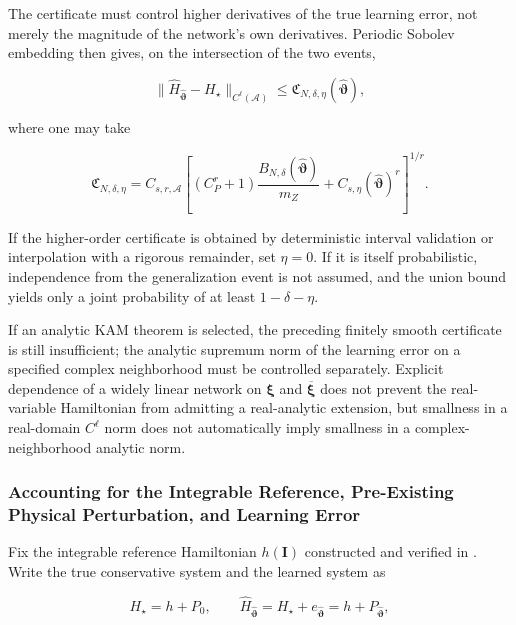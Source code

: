 The certificate must control higher derivatives of the true learning error, not merely the magnitude of the network's own derivatives. Periodic Sobolev embedding then gives, on the intersection of the two events,

\begin{equation}
\label{eq:chnn-4-53}
\left. \parallel{\widehat{H}}_{\widehat{\bm{\vartheta}}} - H_{\star} \right.\parallel_{C^{\ell}\left( \mathcal{A} \right)} \leq \mathfrak{C}_{N,\delta,\eta}\left( \widehat{\bm{\vartheta}} \right),
\end{equation}

where one may take

\begin{equation}
\label{eq:chnn-4-54}
\mathfrak{C}_{N,\delta,\eta} = C_{s,r,\mathcal{A}}\left\lbrack \left( C_{P}^{r} + 1 \right)\frac{B_{N,\delta}\left( \widehat{\bm{\vartheta}} \right)}{m_{Z}} + C_{s,\eta}\left( \widehat{\bm{\vartheta}} \right)^{r} \right\rbrack^{1/r}.
\end{equation}

If the higher-order certificate is obtained by deterministic interval validation or interpolation with a rigorous remainder, set \(\eta=0\). If it is itself probabilistic, independence from the generalization event is not assumed, and the union bound yields only a joint probability of at least \(1-\delta-\eta\).

If an analytic KAM theorem is selected, the preceding finitely smooth certificate is still insufficient; the analytic supremum norm of the learning error on a specified complex neighborhood must be controlled separately. Explicit dependence of a widely linear network on \(\bm{\xi}\) and \(\overline{\bm{\xi}}\) does not prevent the real-variable Hamiltonian from admitting a real-analytic extension, but smallness in a real-domain \(C^{\ell}\) norm does not automatically imply smallness in a complex-neighborhood analytic norm.

\subsubsection{Accounting for the Integrable Reference, Pre-Existing Physical Perturbation, and Learning Error}\label{sec:chnn-4-6-6}

Fix the integrable reference Hamiltonian \(h\left( \mathbf{I} \right)\) constructed and verified in . Write the true conservative system and the learned system as

\begin{equation}
\label{eq:chnn-4-55}
H_{\star} = h + P_{0},\quad\quad{\widehat{H}}_{\widehat{\bm{\vartheta}}} = H_{\star} + e_{\widehat{\bm{\vartheta}}} = h + P_{\widehat{\bm{\vartheta}}},
\end{equation}

